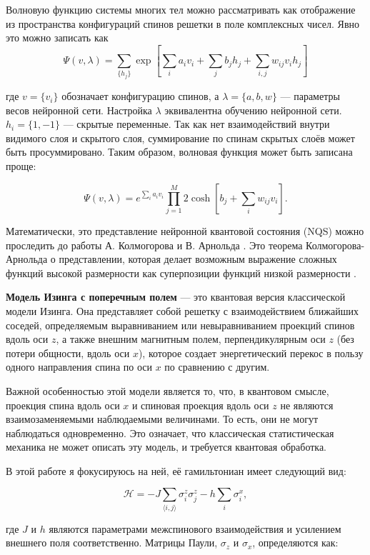 Волновую функцию системы многих тел можно рассматривать как отображение из пространства конфигураций спинов решетки в поле комплексных чисел. Явно это можно записать как
\[
\Psi(v, \lambda) = \sum_{\{h_j\}} \exp \left[ \sum_{i} a_i v_i + \sum_{j} b_j h_j + \sum_{i,j} w_{ij} v_i h_j \right]
\]

где \(v = \{v_i\}\) обозначает конфигурацию спинов, а \(\lambda = \{a, b, w\}\) — параметры весов нейронной сети. Настройка \(\lambda\) эквивалентна обучению нейронной сети. \(h_i = \{1, -1\}\) — скрытые переменные. Так как нет взаимодействий внутри видимого слоя и скрытого слоя, суммирование по спинам скрытых слоёв может быть просуммировано. Таким образом, волновая функция может быть записана проще:

\[
\Psi(v, \lambda) = e^{\sum_i a_i v_i} \prod_{j=1}^{M} 2 \cosh \left[ b_j + \sum_i w_{ij} v_i \right].
\]

Математически, это представление нейронной квантовой состояния (NQS) можно проследить до работы А. Колмогорова и В. Арнольда \cite{kolmogorov1957, arnold1963}. Это теорема Колмогорова-Арнольда о представлении, которая делает возможным выражение сложных функций высокой размерности как суперпозиции функций низкой размерности \cite{kolmogorov1936}.
\vspace{0,25cm}

\textbf{Модель Изинга с поперечным полем} — это квантовая версия классической модели Изинга. Она представляет собой решетку с взаимодействием ближайших соседей, определяемым выравниванием или невыравниванием проекций спинов вдоль оси \(z\), а также внешним магнитным полем, перпендикулярным оси \(z\) (без потери общности, вдоль оси \(x\)), которое создает энергетический перекос в пользу одного направления спина по оси \(x\) по сравнению с другим.

Важной особенностью этой модели является то, что, в квантовом смысле, проекция спина вдоль оси \(x\) и спиновая проекция вдоль оси \(z\) не являются взаимозаменяемыми наблюдаемыми величинами. То есть, они не могут наблюдаться одновременно. Это означает, что классическая статистическая механика не может описать эту модель, и требуется квантовая обработка.

В этой работе я фокусируюсь на ней, её гамильтониан имеет следующий вид:

\[
\mathcal{H} = -J \sum_{\langle i,j \rangle} \sigma^z_i \sigma^z_j - h \sum_{i} \sigma^x_i,
\]

где \(J\) и \(h\) являются параметрами межспинового взаимодействия и усилением внешнего поля соответственно. Матрицы Паули, \(\sigma_z\) и \(\sigma_x\), определяются как:

